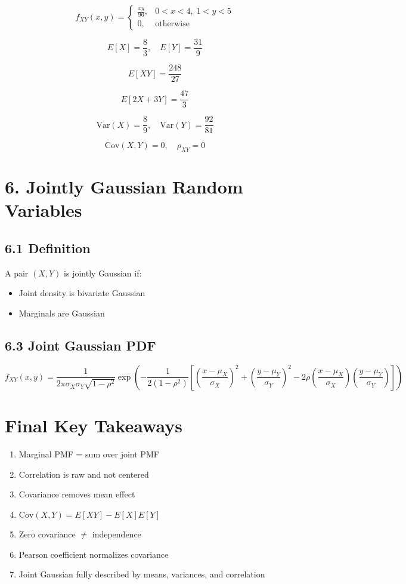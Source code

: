 \documentclass[12pt]{article}
\begin{document}
\[
f_{XY}(x,y) =
\begin{cases}
\frac{xy}{96}, & 0<x<4,\; 1<y<5 \\
0, & \text{otherwise}
\end{cases}
\]

\[
E[X] = \frac{8}{3}, \quad E[Y] = \frac{31}{9}
\]

\[
E[XY] = \frac{248}{27}
\]

\[
E[2X+3Y] = \frac{47}{3}
\]

\[
\text{Var}(X) = \frac{8}{9}, \quad \text{Var}(Y) = \frac{92}{81}
\]

\[
\text{Cov}(X,Y) = 0, \quad \rho_{XY} = 0
\]

\section*{6. Jointly Gaussian Random Variables}

\subsection*{6.1 Definition}

A pair $(X,Y)$ is jointly Gaussian if:
\begin{itemize}
    \item Joint density is bivariate Gaussian
    \item Marginals are Gaussian
\end{itemize}

\subsection*{6.3 Joint Gaussian PDF}

\[
f_{XY}(x,y) =
\frac{1}{2\pi \sigma_X \sigma_Y \sqrt{1-\rho^2}}
\exp\left(
-\frac{1}{2(1-\rho^2)}
\left[
\left(\frac{x-\mu_X}{\sigma_X}\right)^2 +
\left(\frac{y-\mu_Y}{\sigma_Y}\right)^2 -
2\rho \left(\frac{x-\mu_X}{\sigma_X}\right)\left(\frac{y-\mu_Y}{\sigma_Y}\right)
\right]
\right)
\]

\section*{Final Key Takeaways}

\begin{enumerate}
    \item Marginal PMF = sum over joint PMF
    \item Correlation is raw and not centered
    \item Covariance removes mean effect
    \item $\text{Cov}(X,Y) = E[XY] - E[X]E[Y]$
    \item Zero covariance $\neq$ independence
    \item Pearson coefficient normalizes covariance
    \item Joint Gaussian fully described by means, variances, and correlation
\end{enumerate}
\end{document}
